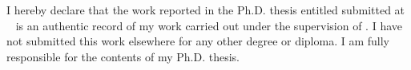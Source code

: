 
\begin{declaration}

\doublespacing
I hereby declare that the work reported in the Ph.D. thesis entitled {} submitted at \  is an authentic record of my work carried out under the supervision of \fontsize{14}{10}{\bfseries{{\SUPERVISORA}}}. I have not submitted this work elsewhere for any other degree or diploma. I am fully responsible for the contents of my Ph.D. thesis. 
\newline
\\
\\
\\
\\
\\
\\
\fontsize{14}{16}{{{(\AUTHOR)}}}\\
\\
\\
\end{declaration} 